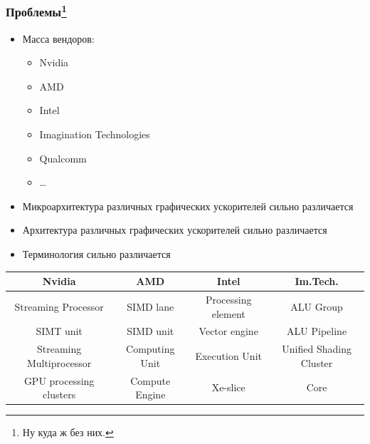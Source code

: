 \documentclass[xcolor=table,aspectratio=169]{beamer}
\begin{document}
\begin{frame}[fragile]
  \frametitle{Проблемы\footnote{Ну куда ж без них.}}
  \begin{itemize}
    \item Масса вендоров:
    \begin{multicols}{3}
    \begin{itemize}
      \item Nvidia
      \item AMD
      \item Intel
      \item Imagination Technologies
      \item Qualcomm
      \item \ldots
    \end{itemize}
  \end{multicols}
    \item Микроархитектура различных графических ускорителей сильно различается
    \item Архитектура различных графических ускорителей сильно различается
    \item Терминология сильно различается
  \end{itemize}
  \begin{center}
  \begin{tabular}{ c c c c}
    \rowcolor{lightgray}
    Nvidia & AMD & Intel & Im.Tech. \\ 
    \hline
    \hline
    Streaming Processor      & SIMD lane      & Processing element & ALU Group               \\  
    \rowcolor{lightgray}
    SIMT unit                & SIMD unit      & Vector engine      & ALU Pipeline            \\
    Streaming Multiprocessor & Computing Unit & Execution Unit     & Unified Shading Cluster \\
    \rowcolor{lightgray}
    GPU processing clusters  & Compute Engine & Xe-slice           & Core
   \end{tabular}
  \end{center}
\end{frame}
\end{document}
